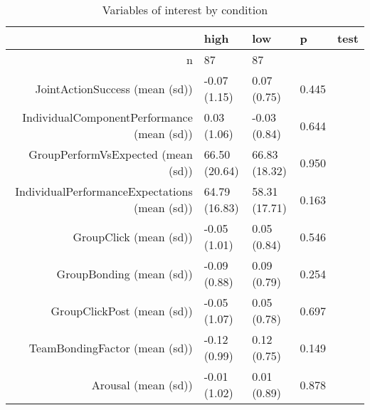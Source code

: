 \begin{table}[ht]
\centering
\begin{tabular}{rllll}
  \hline
 & high & low & p & test \\ 
  \hline
n &    87 &    87 &  &  \\ 
  JointActionSuccess (mean (sd)) & -0.07 (1.15) &  0.07 (0.75) &  0.445 &  \\ 
  IndividualComponentPerformance (mean (sd)) &  0.03 (1.06) & -0.03 (0.84) &  0.644 &  \\ 
  GroupPerformVsExpected (mean (sd)) & 66.50 (20.64) & 66.83 (18.32) &  0.950 &  \\ 
  IndividualPerformanceExpectations (mean (sd)) & 64.79 (16.83) & 58.31 (17.71) &  0.163 &  \\ 
  GroupClick (mean (sd)) & -0.05 (1.01) &  0.05 (0.84) &  0.546 &  \\ 
  GroupBonding (mean (sd)) & -0.09 (0.88) &  0.09 (0.79) &  0.254 &  \\ 
  GroupClickPost (mean (sd)) & -0.05 (1.07) &  0.05 (0.78) &  0.697 &  \\ 
  TeamBondingFactor (mean (sd)) & -0.12 (0.99) &  0.12 (0.75) &  0.149 &  \\ 
  Arousal (mean (sd)) & -0.01 (1.02) &  0.01 (0.89) &  0.878 &  \\ 
   \hline
\end{tabular}
\caption{Variables of interest 
 by condition} 
\label{tab:factorsTimeLow}
\end{table}
